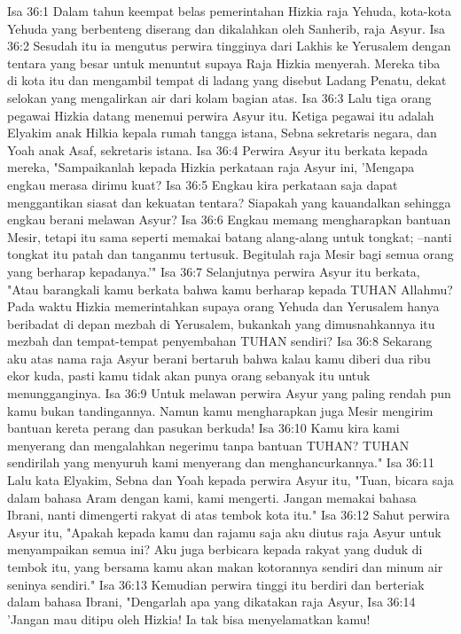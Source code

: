 Isa 36:1  Dalam tahun keempat belas pemerintahan Hizkia raja Yehuda, kota-kota Yehuda yang berbenteng diserang dan dikalahkan oleh Sanherib, raja Asyur.
Isa 36:2  Sesudah itu ia mengutus perwira tingginya dari Lakhis ke Yerusalem dengan tentara yang besar untuk menuntut supaya Raja Hizkia menyerah. Mereka tiba di kota itu dan mengambil tempat di ladang yang disebut Ladang Penatu, dekat selokan yang mengalirkan air dari kolam bagian atas.
Isa 36:3  Lalu tiga orang pegawai Hizkia datang menemui perwira Asyur itu. Ketiga pegawai itu adalah Elyakim anak Hilkia kepala rumah tangga istana, Sebna sekretaris negara, dan Yoah anak Asaf, sekretaris istana.
Isa 36:4  Perwira Asyur itu berkata kepada mereka, "Sampaikanlah kepada Hizkia perkataan raja Asyur ini, 'Mengapa engkau merasa dirimu kuat?
Isa 36:5  Engkau kira perkataan saja dapat menggantikan siasat dan kekuatan tentara? Siapakah yang kauandalkan sehingga engkau berani melawan Asyur?
Isa 36:6  Engkau memang mengharapkan bantuan Mesir, tetapi itu sama seperti memakai batang alang-alang untuk tongkat; --nanti tongkat itu patah dan tanganmu tertusuk. Begitulah raja Mesir bagi semua orang yang berharap kepadanya.'"
Isa 36:7  Selanjutnya perwira Asyur itu berkata, "Atau barangkali kamu berkata bahwa kamu berharap kepada TUHAN Allahmu? Pada waktu Hizkia memerintahkan supaya orang Yehuda dan Yerusalem hanya beribadat di depan mezbah di Yerusalem, bukankah yang dimusnahkannya itu mezbah dan tempat-tempat penyembahan TUHAN sendiri?
Isa 36:8  Sekarang aku atas nama raja Asyur berani bertaruh bahwa kalau kamu diberi dua ribu ekor kuda, pasti kamu tidak akan punya orang sebanyak itu untuk menungganginya.
Isa 36:9  Untuk melawan perwira Asyur yang paling rendah pun kamu bukan tandingannya. Namun kamu mengharapkan juga Mesir mengirim bantuan kereta perang dan pasukan berkuda!
Isa 36:10  Kamu kira kami menyerang dan mengalahkan negerimu tanpa bantuan TUHAN? TUHAN sendirilah yang menyuruh kami menyerang dan menghancurkannya."
Isa 36:11  Lalu kata Elyakim, Sebna dan Yoah kepada perwira Asyur itu, "Tuan, bicara saja dalam bahasa Aram dengan kami, kami mengerti. Jangan memakai bahasa Ibrani, nanti dimengerti rakyat di atas tembok kota itu."
Isa 36:12  Sahut perwira Asyur itu, "Apakah kepada kamu dan rajamu saja aku diutus raja Asyur untuk menyampaikan semua ini? Aku juga berbicara kepada rakyat yang duduk di tembok itu, yang bersama kamu akan makan kotorannya sendiri dan minum air seninya sendiri."
Isa 36:13  Kemudian perwira tinggi itu berdiri dan berteriak dalam bahasa Ibrani, "Dengarlah apa yang dikatakan raja Asyur,
Isa 36:14  'Jangan mau ditipu oleh Hizkia! Ia tak bisa menyelamatkan kamu!
